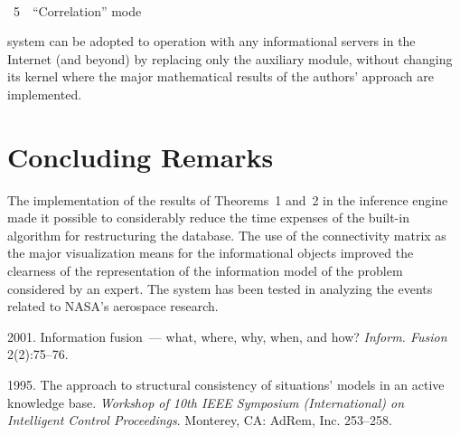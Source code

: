 \begin{multicols}{2}
\vspace*{2pt}


{ \begin{center}  %
 \vspace*{-1pt}
    \mbox{%
 \epsfxsize=79mm 
 }


\vspace*{4pt}


\noindent
{{\figurename~5}\ \ \small{``Correlation'' mode}}
\end{center}
}




\noindent
 system can be adopted to operation with any informational 
servers in the Internet (and beyond) by replacing only the auxiliary module, 
without changing its kernel where the major mathematical results of the authors' 
approach are implemented.
     
\section{Concluding Remarks}

\noindent
The implementation of the results of Theorems~1 and~2 in the inference engine 
made it possible to considerably reduce the time expenses of the built-in algorithm 
for restructuring the database. The use of the connectivity matrix as the major 
visualization means for the informational objects improved the clearness of the 
representation of the information model of the problem considered by an expert. 
The system has been tested in analyzing the events related to NASA's 
aerospace research.
     
     
     \renewcommand{\bibname}{\protect\rmfamily References}
     
     
     \vspace*{-9pt}
     
     {\small\frenchspacing
     {\baselineskip=10.45pt
     \begin{thebibliography}{99}
     
 2001. Information fusion~--- what, where, why, when, and how? 
\textit{Inform. Fusion} 2(2):75--76.
     
 1995. The approach to structural consistency of situations' models in 
an active knowledge base. \textit{Workshop of 10th IEEE Symposium 
(International) on Intelligent Control Proceedings}. Monterey, CA: AdRem, Inc. 
253--258.


\end{thebibliography}}}
\end{multicols}
